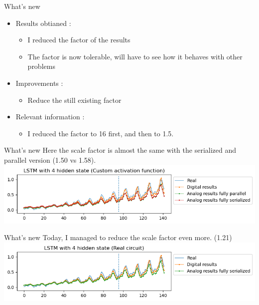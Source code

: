 \documentclass[table]{beamer}
\begin{document}
\begin{frame}{What's new}
  \begin{itemize}
    \item Results obtianed :
      \begin{itemize}
          \color{text}
        \item I reduced the factor of the results
        \item The factor is now tolerable, will have to see how it behaves with other problems
      \end{itemize}
    \item Improvements :
      \begin{itemize}
          \color{text}
        \item Reduce the still existing factor
      \end{itemize}
    \item Relevant information :
      \begin{itemize}
          \color{text}
        \item I reduced the factor to 16 first, and then to 1.5.
      \end{itemize}
  \end{itemize}
\end{frame}

\begin{frame}{What's new}
  Here the scale factor is almost the same with the serialized and parallel version (1.50 vs 1.58).
  \includegraphics[width=\textwidth]{output/factor1.5.png}
\end{frame}

\begin{frame}{What's new}
  Today, I managed to reduce the scale factor even more. (1.21)
  \includegraphics[width=\textwidth]{output/factor1.2.png}
\end{frame}
\end{document}
